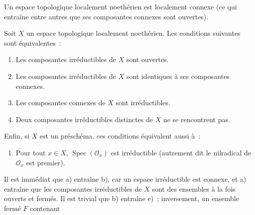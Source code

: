 \begin{corollary}[6.1.9]
\label{I.6.1.9-fr}
Un espace topologique localement noethérien est localement connexe (ce qui
entraîne entre autres que ses composantes connexes sont ouvertes).
\end{corollary}

\begin{proposition}[6.1.10]
\label{I.6.1.10-fr}
Soit $X$ un espace topologique localement noethérien. Les conditions suivantes
sont équivalentes~:
\begin{enumerate}
  \item[a)] Les composantes irréductibles de $X$ sont ouvertes.
  \item[b)] Les composantes irréductibles de $X$ sont identiques à ses
    composantes connexes.
  \item[c)] Les composantes connexes de $X$ sont irréductibles.
  \item[d)] Deux composantes irréductibles distinctes de $X$ ne se rencontrent
    pas.
\end{enumerate}

Enfin, si $X$ est un préschéma, ces conditions équivalent aussi à~:
\begin{enumerate}
  \item[e)] Pour tout $x\in X$, $\operatorname{Spec}(\mathscr{O}_x)$ est
    irréductible (autrement dit le nilradical de $\mathscr{O}_x$ est premier).
\end{enumerate}
\end{proposition}

Il est immédiat que a) entraîne b), car un espace irréductible est connexe, et
a) entraîne que les composantes irréductibles de $X$ sont des ensembles à la
fois ouverts et fermés. Il est trivial que b) entraîne c)~; inversement, un
ensemble fermé $F$ contenant
